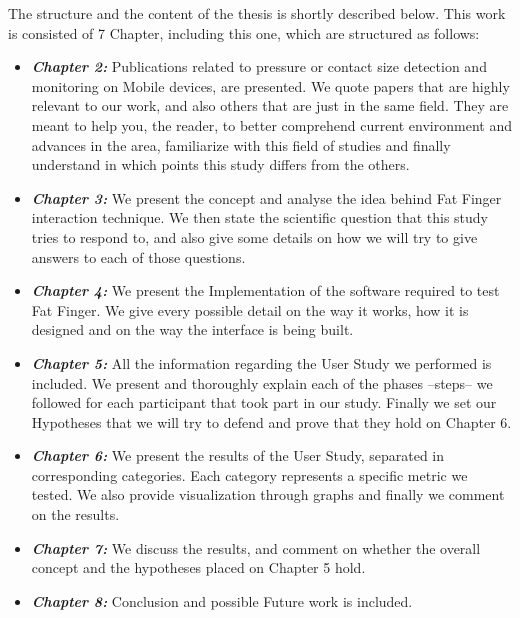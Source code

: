 The structure and the content of the thesis is shortly described below. This work is consisted of 7 Chapter, including this one, which are structured as follows:

\begin{itemize}
    \item \textbf{\textit{Chapter 2:}} Publications related to pressure or contact size detection and monitoring on Mobile devices, are presented. We quote papers that are highly relevant to our work, and also others that are just in the same field. They are meant to help you, the reader, to better comprehend current environment and advances in the area, familiarize with this field of studies and finally understand in which points this study differs from the others.
    \item \textbf{\textit{Chapter 3:}} We present the concept and analyse the idea behind Fat Finger interaction technique. We then state the scientific question that this study tries to respond to, and also give some details on how we will try to give answers to each of those questions.
    \item \textbf{\textit{Chapter 4:}} We present the Implementation of the software required to test Fat Finger. We give every possible detail on the way it works, how it is designed and on the way the interface is being built. 
    \item \textbf{\textit{Chapter 5:}} All the information regarding the User Study we performed is included. We present and thoroughly explain each of the phases --steps-- we followed for each participant that took part in our study. Finally we set our Hypotheses that we will try to defend and prove that they hold on Chapter 6. 
    \item \textbf{\textit{Chapter 6:}} We present the results of the User Study, separated in corresponding categories. Each category represents a specific metric we tested. We also provide visualization through graphs and finally we comment on the results.
    \item \textbf{\textit{Chapter 7:}} We discuss the results, and comment on whether the overall concept and the hypotheses placed on Chapter 5 hold.
    \item \textbf{\textit{Chapter 8:}} Conclusion and possible Future work is included.
\end{itemize}   
